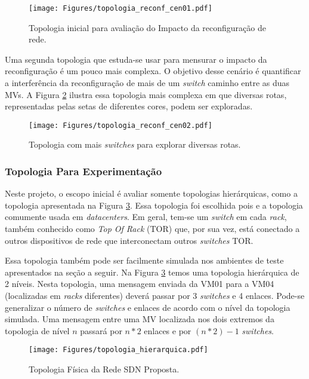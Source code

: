 \documentclass[10pt, conference, compsocconf]{IEEEtran}
\begin{document}
\begin{figure}[h!]
\centering
\texttt{[image: Figures/topologia\_reconf\_cen01.pdf]} 
\caption{Topologia inicial para avaliação do Impacto da reconfiguração de rede.}
\label{figura:reconf_rede01}
\end{figure}

Uma segunda topologia que estuda-se usar para mensurar o impacto da reconfiguração é um pouco mais complexa. O objetivo desse cenário é quantificar a interferência da reconfiguração de mais de um \textit{switch} caminho entre as duas MVs. A Figura \ref{figura:reconf_rede02} ilustra essa topologia mais complexa em que diversas rotas, representadas pelas setas de diferentes cores, podem ser exploradas.

\begin{figure}[h!]
\centering
\texttt{[image: Figures/topologia\_reconf\_cen02.pdf]} 
\caption{Topologia com mais \textit{switches} para explorar diversas rotas.}
\label{figura:reconf_rede02}
\end{figure}

\subsubsection{Topologia Para Experimentação}
Neste projeto, o escopo inicial é avaliar somente topologias hierárquicas, como a topologia apresentada na Figura \ref{figura:topology}. Essa topologia foi escolhida pois e a topologia comumente usada em \textit{datacenters}. Em geral, tem-se um \textit{switch} em cada \textit{rack}, também conhecido como \textit{Top Of Rack} (TOR) que, por sua vez, está conectado a outros dispositivos de rede que interconectam outros \textit{switches} TOR.

Essa topologia também pode ser facilmente simulada nos ambientes de teste apresentados na seção a seguir. Na Figura \ref{figura:topology} temos uma topologia hierárquica de 2 níveis. Nesta topologia, uma mensagem enviada da VM01 para a VM04 (localizadas em \textit{racks} diferentes) deverá passar por 3 \textit{switches} e 4 enlaces. Pode-se generalizar o número de \textit{switches} e enlaces de acordo com o nível da topologia simulada. Uma mensagem entre uma MV localizada nos dois extremos da topologia de nível $n$ passará por $n*2$ enlaces e por $(n*2)-1$ \textit{switches}.

\begin{figure}[h!]
\centering
\texttt{[image: Figures/topologia\_hierarquica.pdf]} 
\caption{Topologia Física da Rede SDN Proposta.}
\label{figura:topology}
\end{figure}
\end{document}
